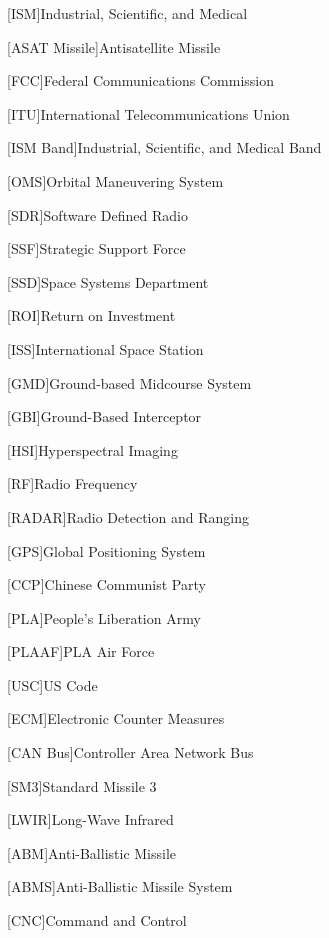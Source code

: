 
[ISM]{Industrial, Scientific, and Medical}

[ASAT Missile]{Antisatellite Missile}

[FCC]{Federal Communications Commission}

[ITU]{International Telecommunications Union}

[ISM Band]{Industrial, Scientific, and Medical Band}

[OMS]{Orbital Maneuvering System}

[SDR]{Software Defined Radio}

[SSF]{Strategic Support Force}

[SSD]{Space Systems Department}

[ROI]{Return on Investment}

[ISS]{International Space Station}

[GMD]{Ground-based Midcourse System}

[GBI]{Ground-Based Interceptor}

[HSI]{Hyperspectral Imaging}

[RF]{Radio Frequency}

[RADAR]{Radio Detection and Ranging}

[GPS]{Global Positioning System}

[CCP]{Chinese Communist Party}

[PLA]{People's Liberation Army}

[PLAAF]{PLA Air Force}

[USC]{US Code}

[ECM]{Electronic Counter Measures}

[CAN Bus]{Controller Area Network Bus}

[SM3]{Standard Missile 3}

[LWIR]{Long-Wave Infrared}

[ABM]{Anti-Ballistic Missile}

[ABMS]{Anti-Ballistic Missile System}

[CNC]{Command and Control}

